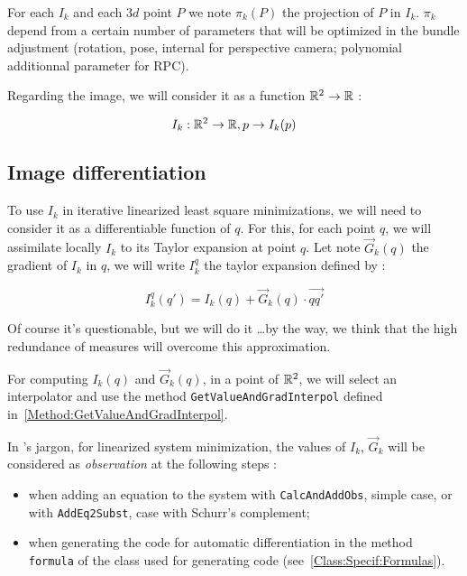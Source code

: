 For each $I_k$ and each $3d$ point $P$ we note  $\pi_k(P)$ the projection of 
$P$ in $I_k$. $\pi_k$ depend from a certain number of parameters that will
be optimized in the bundle adjustment (rotation, pose, internal for perspective
camera; polynomial additionnal parameter for RPC).

Regarding the image, we will consider it as a function $\mathbb{R}^2 \rightarrow  \mathbb{R}$ :

\begin{equation}
    I_k : \mathbb{R}^2 \rightarrow  \mathbb{R}  ,  p    \rightarrow  I_k(p) 
\end{equation}


\subsection{Image differentiation}

To use $I_k$ in iterative linearized least square minimizations,  we will need
to consider it as a differentiable function of $q$.  For this, for each point $q$,
we will assimilate locally $I_k$ to its Taylor expansion at point $q$. Let
note  $\vec G_k(q)$ the gradient of $I_k$ in $q$, we will write $I^q_k$ the
taylor expansion defined by :

\begin{equation}
   I^q_k(q') = I_k(q) + \vec G_k(q) \cdot  \overrightarrow{q q'} 
\end{equation}

Of course it's questionable, but we will do it \dots by the way, we think that the  high
redundance of measures will overcome this approximation.

For computing $I_k(q)$ and $\vec G_k(q)$, in a point of $\mathbb{R}^2$,
we will select an interpolator and use the method {\tt GetValueAndGradInterpol}
defined in~\ref{Method:GetValueAndGradInterpol}.

In \PPP's jargon, for linearized system minimization, the values of $I_k$, $\vec G_k$   will be considered as \emph{observation} 
at the following steps :

\begin{itemize}
   \item  when adding an equation to the system with {\tt CalcAndAddObs}, simple case,
          or with {\tt AddEq2Subst}, case with Schurr's complement;
          
   \item  when generating the code for automatic differentiation in the method {\tt formula}
          of the class used for generating code (see~\ref{Class:Specif:Formulas}).
\end{itemize}

